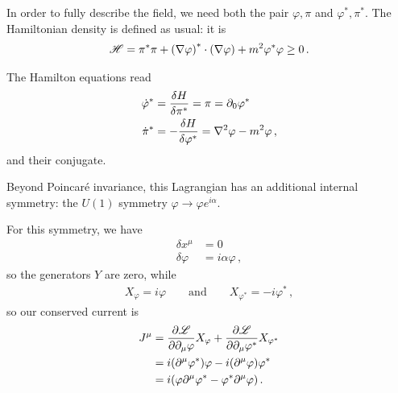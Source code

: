 \documentclass[main.tex]{subfiles}
\begin{document}
In order to fully describe the field, we need both the pair \(\varphi, \pi  \) and \(\varphi^{*}, \pi^{*}\). 
The Hamiltonian density is defined as usual: it is 
%
\begin{align}
\mathscr{H} = \pi^{* } \pi + \qty(\nabla \varphi )^{*} \cdot \qty(\nabla \varphi ) + m^2\varphi^{*} \varphi \geq 0
\,.
\end{align}

\begin{claim}
The Hamilton equations read 
%
\begin{subequations}
\begin{align}
\dot{\varphi}^{*} &= \fdv{H}{\pi^{*}} 
= \pi = \partial_0 \varphi^{*} \\
\dot{\pi}^{*} &= - \fdv{H}{\varphi^{*}} 
= \nabla^2 \varphi  -m^2 \varphi 
\,,
\end{align}
\end{subequations}
%
and their conjugate.
\end{claim}


Beyond Poincaré invariance, this Lagrangian has an additional internal symmetry: the \(U(1)\) symmetry \(\varphi \to \varphi e^{i \alpha }\). 

For this symmetry, we have 
%
\begin{subequations}
\begin{align}
\delta x^{\mu } &= 0   \\
\delta \varphi &= i \alpha \varphi 
\,,
\end{align}
\end{subequations}
%
so the generators \(Y\) are zero, while 
%
\begin{align}
X_{\varphi } = i \varphi  
\qquad \text{and} \qquad
X_{\varphi^{*}} = -i \varphi^{*}
\,,
\end{align}
%
so our conserved current is 
%
\begin{subequations}
\begin{align}
J^{\mu } &= \pdv{\mathscr{L}}{\partial_{\mu} \varphi} X_{\varphi } + \pdv{\mathscr{L}}{\partial_{\mu} \varphi^{*}} X_{\varphi^{*}}  \\
&= i \qty(\partial^{\mu } \varphi^{*}) \varphi 
- i \qty(\partial^{\mu} \varphi ) \varphi^{*}  \\
&= i \qty(\varphi \partial^{\mu} \varphi^{*}- \varphi^{*} \partial^{\mu } \varphi )
\,.
\end{align}
\end{subequations}
\end{document}
